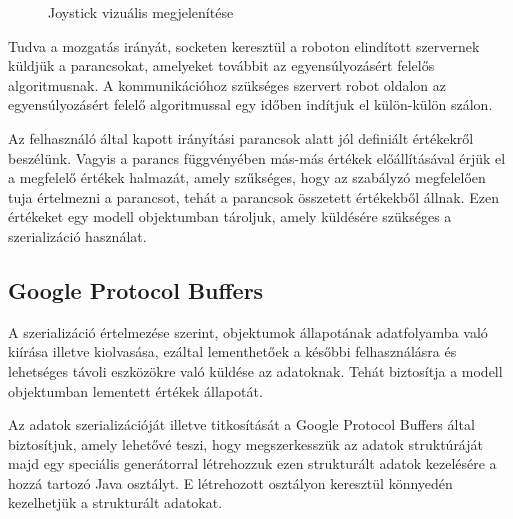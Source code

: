 \begin{figure}[!htb]
	\centering
	\caption{Joystick vizuális megjelenítése}
	\label{fig:joystick}
\end{figure}

Tudva a mozgatás irányát, socketen keresztül a roboton elindított szervernek küldjük a parancsokat, amelyeket továbbit az egyensúlyozásért felelős algoritmusnak. A kommunikációhoz szükséges szervert robot oldalon az egyensúlyozásért felelő algoritmussal egy időben indítjuk el külön-külön szálon.

Az felhasználó által kapott irányítási parancsok alatt jól definiált értékekről beszélünk. Vagyis a parancs függvényében más-más értékek előállításával érjük el a megfelelő értékek halmazát, amely szűkséges, hogy az szabályzó megfelelően tuja értelmezni a parancsot, tehát a parancsok összetett értékekből állnak. Ezen értékeket egy modell objektumban tároljuk, amely küldésére szükséges a szerializáció használat.

\subsection{Google Protocol Buffers}

A szerializáció értelmezése szerint, objektumok állapotának adatfolyamba való kiírása illetve kiolvasása, ezáltal lementhetőek a későbbi felhasználásra és lehetséges távoli eszközökre való küldése az adatoknak. Tehát biztosítja a modell objektumban lementett értékek állapotát.

Az adatok szerializációját illetve titkosítását a Google Protocol Buffers által biztosítjuk, amely lehetővé teszi, hogy megszerkesszük az adatok struktúráját majd egy speciális generátorral létrehozzuk ezen strukturált adatok kezelésére a hozzá tartozó Java osztályt. E létrehozott osztályon keresztül könnyedén kezelhetjük a strukturált adatokat.

